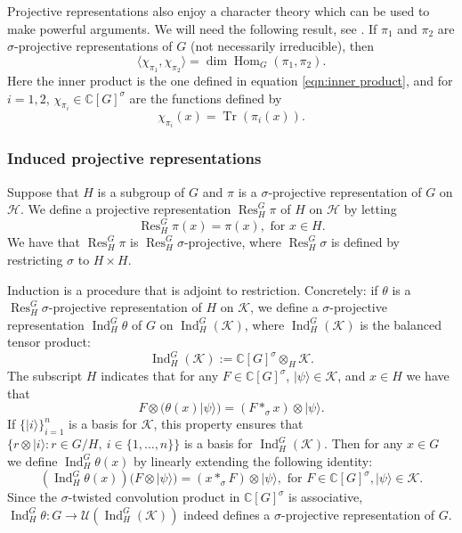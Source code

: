 \documentclass[11pt]{article}
\theoremstyle{definition}
\def\ket#1{| #1 \rangle}
\newcommand{\bbC}{\mathbb{C}}
\newcommand{\calH}{\mathcal{H}}
\newcommand{\calK}{\mathcal{K}}
\newcommand{\calU}{\mathcal{U}}
\newcommand{\Ind}{\operatorname{Ind}}
\newcommand{\Res}{\operatorname{Res}}
\newcommand{\Hom}{\operatorname{Hom}}
\newcommand{\Tr}{\operatorname{Tr}}
\begin{document}
Projective representations also enjoy a character theory which can be used to make powerful arguments. We will need the following result, see \cite[Proposition 2.2]{Cheng15}. If $\pi_1$ and $\pi_2$ are $\sigma$-projective representations of $G$ (not necessarily irreducible), then
\begin{equation}\label{eqn:inner porduct of characters}
    \langle \chi_{\pi_1}, \chi_{\pi_2} \rangle = \dim \Hom_G(\pi_1,\pi_2).
\end{equation}
Here the inner product is the one defined in equation \eqref{eqn:inner product}, and for $i = 1,2$, $\chi_{\pi_i} \in \bbC[G]^\sigma$ are the functions defined by
\begin{equation*}
    \chi_{\pi_i}(x) = \Tr(\pi_i(x)).
\end{equation*}

\subsubsection{Induced projective representations}

Suppose that $H$ is a subgroup of $G$ and $\pi$ is a $\sigma$-projective representation of $G$ on $\calH$. We define a projective representation $\Res^G_H \pi$ of $H$ on $\calH$ by letting
\begin{equation*}
    \Res^G_H\pi(x) = \pi(x), \text{ for } x \in H.
\end{equation*}
We have that $\Res^G_H \pi$ is $\Res^G_H\sigma$-projective, where $\Res^G_H\sigma$ is defined by restricting $\sigma$ to $H \times H$. 

Induction is a procedure that is adjoint to restriction. Concretely: if $\theta$ is a $\Res^G_H\sigma$-projective representation of $H$ on $\calK$, we define a $\sigma$-projective representation $\Ind_H^G\theta$ of $G$ on $\Ind_H^G(\calK)$, where $\Ind_H^G(\calK)$ is the balanced tensor product:
\begin{equation*}
    \Ind_H^G(\calK) := \bbC[G]^\sigma \otimes_H \calK.
\end{equation*}
The subscript $H$ indicates that for any $F \in \bbC[G]^\sigma$, $\ket{\psi} \in \calK$, and $x \in H$ we have that
\begin{equation*}
    F \otimes (\theta(x) \ket{\psi}) = (F *_\sigma x) \otimes \ket{\psi}.
\end{equation*}
If $\{\ket{i}\}_{i = 1}^n$ is a basis for $\calK$, this property ensures that $\{ r \otimes \ket{i} : r \in G/H, \ i \in \{1,\dots,n\} \}$ is a basis for $\Ind_H^G(\calK)$.
Then for any $x \in G$ we define $\Ind_H^G\theta(x)$ by linearly extending the following identity:
\begin{equation*}
    (\Ind_H^G\theta(x))(F \otimes \ket{\psi}) = (x *_\sigma F) \otimes \ket{\psi}, \text{ for } F \in \bbC[G]^\sigma, \ket{\psi} \in \calK.
\end{equation*}
Since the $\sigma$-twisted convolution product in $\bbC[G]^\sigma$ is associative, $\Ind^G_H\theta \colon G \to \calU(\Ind^G_H(\calK))$ indeed defines a $\sigma$-projective representation of $G$.
\end{document}

